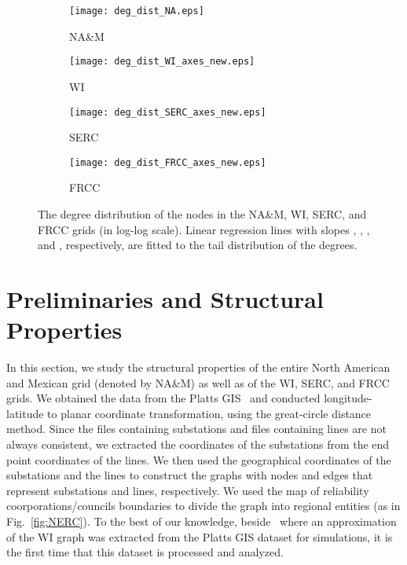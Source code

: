 \documentclass[10pt,journal]{IEEEtran}
\begin{document}
\begin{figure*}[t]
\centering
\begin{subfigure}[b]{0.24\textwidth}
\vspace*{-0.2cm}
\texttt{[image: deg\_dist\_NA.eps]}
\vspace*{-0.2cm}
\caption{NA\&M}
\end{subfigure}
\begin{subfigure}[b]{0.24\textwidth}
\vspace*{-0.2cm}
\texttt{[image: deg\_dist\_WI\_axes\_new.eps]}
\vspace*{-0.2cm}
\caption{WI}
\end{subfigure}
\begin{subfigure}[b]{0.24\textwidth}
\vspace*{-0.2cm}
\texttt{[image: deg\_dist\_SERC\_axes\_new.eps]}
\vspace*{-0.2cm}
\caption{SERC}
\end{subfigure}
\begin{subfigure}[b]{0.24\textwidth}
\vspace*{-0.2cm}
\texttt{[image: deg\_dist\_FRCC\_axes\_new.eps]}
\vspace*{-0.2cm}
\caption{FRCC}
\end{subfigure}
\caption{The degree distribution of the nodes in the NA\&M, WI, SERC, and FRCC grids (in
log-log scale). Linear regression lines with slopes , , , and , respectively, are fitted to
the tail distribution of the degrees.}
\label{fig:deg_dist_WI}
\vspace*{0.2cm}
\end{figure*}

\section{Preliminaries and Structural Properties}\label{sec:struc_prop}
In this section, we study the structural properties of the entire North American and Mexican grid (denoted by \mbox{NA\&M}) as well as of the WI, SERC, and FRCC grids.
We obtained the data from the Platts GIS~\cite{GIS} and conducted longitude-latitude to planar  coordinate transformation, using the great-circle distance method. Since the files containing substations and files containing lines are not always consistent,
we extracted the coordinates of the substations from the end point coordinates of the lines.  We then used the geographical coordinates of the substations and the lines to construct the graphs with nodes and edges that represent substations and lines, respectively.  We used the map of reliability coorporations/councils boundaries to divide the graph into regional entities (as in Fig.~\ref{fig:NERC}).
To the best of our knowledge, beside~\cite{SmartGridComm11rep,Soltan2014Cascade} where an approximation of the WI graph was extracted from the Platts GIS dataset for simulations, it is the first time that this dataset is processed and analyzed.
\end{document}
